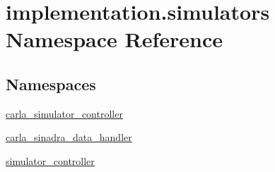 \hypertarget{namespaceimplementation_1_1simulators}{}\section{implementation.\+simulators Namespace Reference}
\label{namespaceimplementation_1_1simulators}
\subsection*{Namespaces}
\begin{DoxyCompactItemize}
\item 
 \hyperlink{namespaceimplementation_1_1simulators_1_1carla__simulator__controller}{carla\+\_\+simulator\+\_\+controller}
\item 
 \hyperlink{namespaceimplementation_1_1simulators_1_1carla__sinadra__data__handler}{carla\+\_\+sinadra\+\_\+data\+\_\+handler}
\item 
 \hyperlink{namespaceimplementation_1_1simulators_1_1simulator__controller}{simulator\+\_\+controller}
\end{DoxyCompactItemize}
